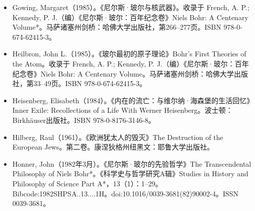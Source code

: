 \begin{itemize}
\item Gowing, Margaret（1985）。《尼尔斯·玻尔与核武器》。收录于 French, A. P.; Kennedy, P. J.（编）《尼尔斯·玻尔：百年纪念卷》Niels Bohr: A Centenary Volume*。马萨诸塞州剑桥：哈佛大学出版社，第266–277页。ISBN 978-0-674-62415-3。
\item Heilbron, John L.（1985）。《玻尔最初的原子理论》Bohr's First Theories of the Atom。收录于 French, A. P.; Kennedy, P. J.（编）《尼尔斯·玻尔：百年纪念卷》Niels Bohr: A Centenary Volume。马萨诸塞州剑桥：哈佛大学出版社，第33–49页。ISBN 978-0-674-62415-3。
\item Heisenberg, Elisabeth（1984）。《内在的流亡：与维尔纳·海森堡的生活回忆》Inner Exile: Recollections of a Life With Werner Heisenberg。波士顿：Birkhäuser出版社。ISBN 978-0-8176-3146-8。
\item Hilberg, Raul（1961）。《欧洲犹太人的毁灭》The Destruction of the European Jews。第二卷。康涅狄格州纽黑文：耶鲁大学出版社。
\item Honner, John（1982年3月）。《尼尔斯·玻尔的先验哲学》The Transcendental Philosophy of Niels Bohr*。《科学史与哲学研究A辑》Studies in History and Philosophy of Science Part A*，13（1）：1–29。Bibcode:1982SHPSA..13....1H。doi:10.1016/0039-3681(82)90002-4。ISSN 0039-3681。


\end{itemize}
